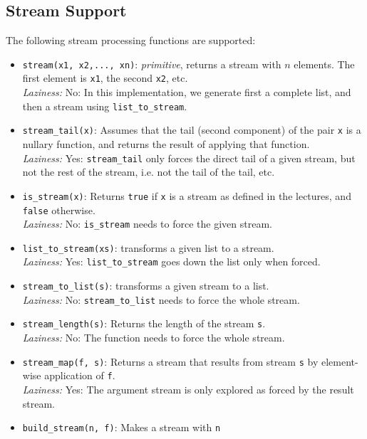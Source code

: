 \subsection*{Stream Support}

The following stream processing functions are supported:

\begin{itemize}
\item \lstinline{stream(x1, x2,..., xn)}: \textit{primitive}, returns a stream with $n$ elements. The
first element is \lstinline{x1}, the second \lstinline{x2}, etc.\\
\emph{Laziness:}  No: In this implementation, we generate first a
           complete list, and then a stream using \lstinline{list_to_stream}.
\item \lstinline{stream_tail(x)}: Assumes that the tail (second component) of the
  pair \lstinline{x} is a nullary function, and returns the result of
  applying that function.\\
\emph{Laziness:}  Yes: \lstinline{stream_tail} only forces the direct tail of a given
stream,
but not the rest of the stream, i.e. not the tail of the tail, etc.
\item \lstinline{is_stream(x)}: Returns \lstinline{true} if
  \lstinline{x} is a stream as defined in the lectures, and
  \lstinline{false} otherwise.\\
\emph{Laziness:}  No: \lstinline{is_stream} needs to force the given stream.
\item \lstinline{list_to_stream(xs)}: transforms a given list to a stream.\\
\emph{Laziness:}  Yes: \lstinline{list_to_stream} goes down the list only when forced.
\item \lstinline{stream_to_list(s)}: transforms a given stream to a list.\\
\emph{Laziness:}  No: \lstinline{stream_to_list} needs to force the whole stream.
\item \lstinline{stream_length(s)}: Returns the length of the stream
  \lstinline{s}.\\
\emph{Laziness:}  No: The function needs to force the whole stream.
\item \lstinline{stream_map(f, s)}: Returns a stream that results from stream
  \lstinline{s} by element-wise application of \lstinline{f}.\\
\emph{Laziness:}  Yes: The argument stream is only explored as forced by
           the result stream.
\item \lstinline{build_stream(n, f)}: Makes a stream with \lstinline{n}

\end{itemize}
